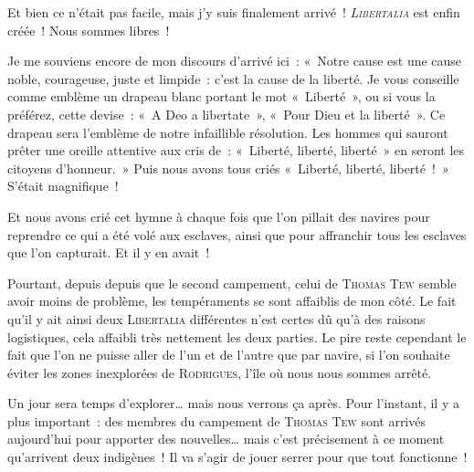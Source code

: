 {
		Et bien ce n’était pas facile, mais j’y suis finalement arrivé~!
		\emph{\textsc{Libertalia}} est enfin créée~!
		Nous sommes libres~!

		Je me souviens encore de mon discours d’arrivé ici~:  «~Notre cause est une cause noble, courageuse, juste et limpide~:  c’est la cause de la liberté.  Je vous conseille comme emblème un drapeau blanc portant le mot «~Liberté~», ou si vous la préférez, cette devise~:  «~A Deo a libertate~», «~Pour Dieu et la liberté~».  Ce drapeau sera l’emblème de notre infaillible résolution.  Les hommes qui sauront prêter une oreille attentive aux cris de~: «~Liberté, liberté, liberté~» en seront les citoyens d’honneur.~»
		Puis nous avons tous criés «~Liberté, liberté, liberté~!~»
		S’était magnifique~!

		Et nous avons crié cet hymne à chaque fois que l’on pillait des navires pour reprendre ce qui a été volé aux esclaves, ainsi que pour affranchir tous les esclaves que l’on capturait.
		Et il y en avait~!

		Pourtant, depuis depuis que le second campement, celui de \textsc{Thomas Tew} semble avoir moins de problème, les tempéraments se sont affaiblis de mon côté.
		Le fait qu’il y ait ainsi deux \textsc{Libertalia} différentes n’est certes dû qu’à des raisons logistiques, cela affaibli très nettement les deux parties.
		Le pire reste cependant le fait que l’on ne puisse aller de l’un et de l’autre que par navire, si l’on souhaite éviter les zones inexplorées de \textsc{Rodrigues}, l’île où nous nous sommes arrêté.

		Un jour sera temps d’explorer… mais nous verrons ça après.
		Pour l’instant, il y a plus important~:  des membres du campement de \textsc{Thomas Tew} sont arrivés aujourd’hui pour apporter des nouvelles… mais c’est précisement à ce moment qu’arrivent deux indigènes~!
		Il va s’agir de jouer serrer pour que tout fonctionne~!
}

